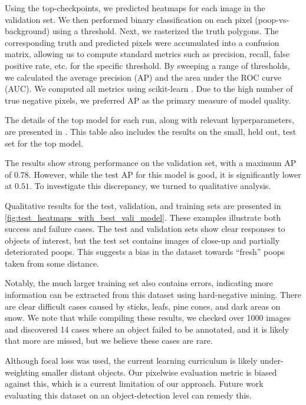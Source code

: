 Using the top-checkpoints, we predicted heatmaps for each image in the validation set.
We then performed binary classification on each pixel (poop-vs-background) using a threshold.
Next, we rasterized the truth polygons.
The corresponding truth and predicted pixels were accumulated into a confusion matrix, allowing us to
  compute standard metrics such as precision, recall, false positive rate, etc.
\cite{powers_evaluation_2011} for the specific threshold.
By sweeping a range of thresholds, we calculated the average precision (AP) and the area under the ROC curve
  (AUC).
We computed all metrics using scikit-learn \cite{scikit-learn}.
Due to the high number of true negative pixels, we preferred AP as the primary measure of model quality.
  
The details of the top model for each run, along with relevant hyperparameters, are presented in
  .
This table also includes the results on the small, held out, test set for the top model.

The results show strong performance on the validation set, with a maximum AP of $0.78$.
However, while the test AP for this model is good, it is significantly lower at $0.51$.
To investigate this discrepancy, we turned to qualitative analysis.

Qualitative results for the test, validation, and training sets are presented in
  \cref{fig:test_heatmaps_with_best_vali_model}.
These examples illustrate both success and failure cases.
The test and validation sets show clear responses to objects of interest, but the test set contains images
  of close-up and partially deteriorated poops.
This suggests a bias in the dataset towards ``fresh'' poops taken from some distance.

Notably, the much larger training set also contains errors, indicating more information can be extracted
  from this dataset using hard-negative mining.
There are clear difficult cases caused by sticks, leafs, pine cones, and dark areas on snow.
We note that while compiling these results, we checked over 1000 images and discovered 14 cases where an
  object failed to be annotated, and it is likely that more are missed, but we believe these cases are rare.

Although focal loss was used, the current learning curriculum is likely under-weighting smaller distant
  objects.
Our pixelwise evaluation metric is biased against this, which is a current limitation of our approach.
Future work evaluating this dataset on an object-detection level can remedy this.

